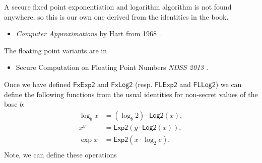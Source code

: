 
A secure fixed point exponentiation and logarithm algorithm is not found anywhere, so
this is our own one derived from the identities in the book.
\begin{itemize}
\item {\em Computer Approximations} by Hart from 1968 \cite{Hart:1978:CA:540084}.
\end{itemize}
The floating point variants are in
\begin{itemize}
\item Secure Computation on Floating Point Numbers {\em NDSS 2013} \cite{ABZS13}.
\end{itemize}
Once we have defined $\mathsf{FxExp2}$ and $\mathsf{FxLog2}$
(resp. $\mathsf{FLExp2}$ and $\mathsf{FLLog2}$) we can
define the following functions from the usual identities
for non-secret values of the base $b$:
\begin{align*}
	\log_b x &= (\log_b 2) \cdot \mathsf{Log2}(x), \\
	x^y      &= \mathsf{Exp2}(y \cdot \mathsf{Log2}(x)), \\
	\exp   x &= \mathsf{Exp2}(x \cdot \log_2 e), \\
\end{align*}
Note, we can define these operations 

